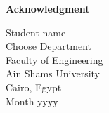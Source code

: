 \cleardoublepage
\newpage
\thispagestyle{empty}

\begin{center}\huge \textbf{Acknowledgment}\end{center}

\begin{flushright}
\large
Student name\\
Choose Department\\
Faculty of Engineering\\
Ain Shams University\\
Cairo, Egypt\\
Month yyyy
\end{flushright}







